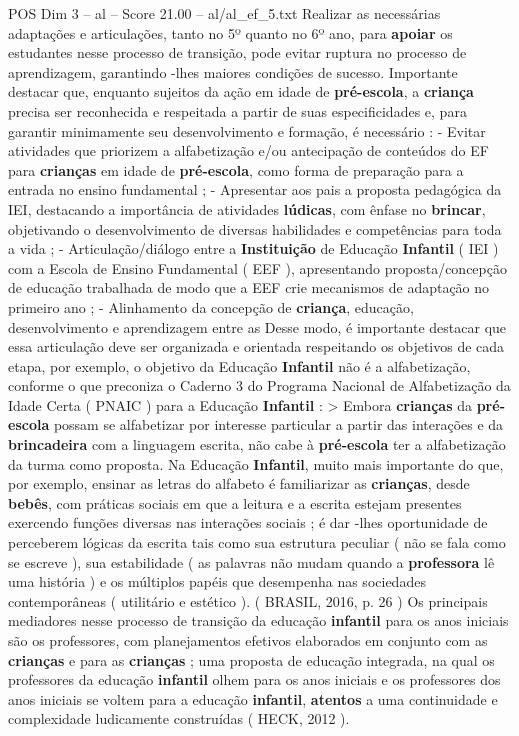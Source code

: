 \begin{textsample}{POS Dim 3 – al – Score 21.00 – al/al\_ef\_5.txt}
Realizar as necessárias adaptações e articulações, tanto no 5º quanto no 6º ano, para \textbf{apoiar} os estudantes nesse processo de transição, pode evitar ruptura no processo de aprendizagem, garantindo -lhes maiores condições de sucesso.
Importante destacar que, enquanto sujeitos da ação em idade de \textbf{pré-escola}, a \textbf{criança} precisa ser reconhecida e respeitada a partir de suas especificidades e, para garantir minimamente seu desenvolvimento e formação, é necessário : - Evitar atividades que priorizem a alfabetização e/ou antecipação de conteúdos do EF para \textbf{crianças} em idade de \textbf{pré-escola}, como forma de preparação para a entrada no ensino fundamental ; - Apresentar aos pais a proposta pedagógica da IEI, destacando a importância de atividades \textbf{lúdicas}, com ênfase no \textbf{brincar}, objetivando o desenvolvimento de diversas habilidades e competências para toda a vida ; - Articulação/diálogo entre a \textbf{Instituição} de Educação \textbf{Infantil} ( IEI ) com a Escola de Ensino Fundamental ( EEF ), apresentando proposta/concepção de educação trabalhada de modo que a EEF crie mecanismos de adaptação no primeiro ano ; - Alinhamento da concepção de \textbf{criança}, educação, desenvolvimento e aprendizagem entre as Desse modo, é importante destacar que essa articulação deve ser organizada e orientada respeitando os objetivos de cada etapa, por exemplo, o objetivo da Educação \textbf{Infantil} não é a alfabetização, conforme o que preconiza o Caderno 3 do Programa Nacional de Alfabetização da Idade Certa ( PNAIC ) para a Educação \textbf{Infantil} : > Embora \textbf{crianças} da \textbf{pré-escola} possam se alfabetizar por interesse particular a partir das interações e da \textbf{brincadeira} com a linguagem escrita, não cabe à \textbf{pré-escola} ter a alfabetização da turma como proposta.
Na Educação \textbf{Infantil}, muito mais importante do que, por exemplo, ensinar as letras do alfabeto é familiarizar as \textbf{crianças}, desde \textbf{bebês}, com práticas sociais em que a leitura e a escrita estejam presentes exercendo funções diversas nas interações sociais ; é dar -lhes oportunidade de perceberem lógicas da escrita tais como sua estrutura peculiar ( não se fala como se escreve ), sua estabilidade ( as palavras não mudam quando a \textbf{professora} lê uma história ) e os múltiplos papéis que desempenha nas sociedades contemporâneas ( utilitário e estético ). ( BRASIL, 2016, p. 26 ) Os principais mediadores nesse processo de transição da educação \textbf{infantil} para os anos iniciais são os professores, com planejamentos efetivos elaborados em conjunto com as \textbf{crianças} e para as \textbf{crianças} ; uma proposta de educação integrada, na qual os professores da educação \textbf{infantil} olhem para os anos iniciais e os professores dos anos iniciais se voltem para a educação \textbf{infantil}, \textbf{atentos} a uma continuidade e complexidade ludicamente construídas ( HECK, 2012 ).

\end{textsample}
